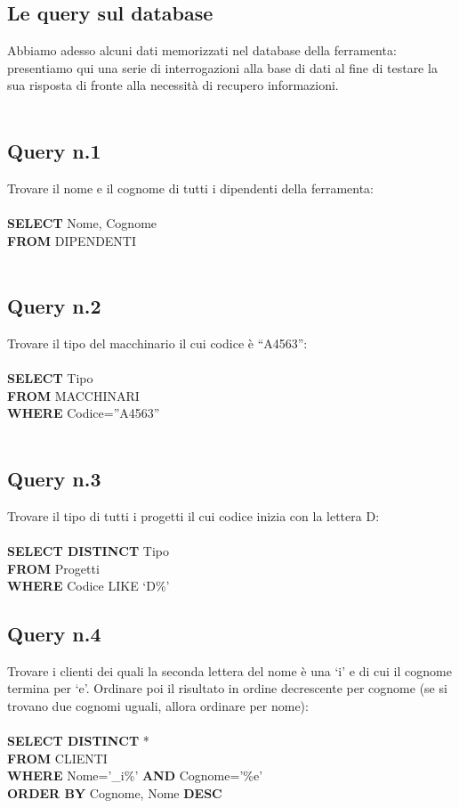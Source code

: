 \documentclass[a4paper,12pt,italian]{article}
\begin{document}
\subsection{Le query sul database}
Abbiamo adesso alcuni dati memorizzati nel database della ferramenta: presentiamo qui una serie di interrogazioni alla base di dati al fine di testare la sua risposta di fronte alla necessità di recupero informazioni. \\ \\

\subsection*{Query n.1} 
Trovare il nome e il cognome di tutti i dipendenti della ferramenta: \\ \\
\textbf{SELECT} Nome, Cognome \\
\textbf{FROM} DIPENDENTI \\ \\

\subsection*{Query n.2} 
Trovare il tipo del macchinario il cui codice è “A4563”: \\ \\
\textbf{SELECT} Tipo \\
\textbf{FROM} MACCHINARI \\
\textbf{WHERE} Codice=”A4563” \\ \\

\subsection*{Query n.3} 
Trovare il tipo di tutti i progetti il cui codice inizia con la lettera D: \\ \\
\textbf{SELECT DISTINCT} Tipo \\
\textbf{FROM} Progetti \\
\textbf{WHERE} Codice LIKE ‘D\%’ \\

\subsection*{Query n.4}
Trovare i clienti dei quali la seconda lettera del nome è una ‘i’ e di cui il cognome termina per ‘e’. Ordinare poi il risultato in ordine decrescente per cognome (se si trovano due cognomi uguali, allora ordinare per nome): \\ \\
\textbf{SELECT DISTINCT} * \\
\textbf{FROM} CLIENTI \\
\textbf{WHERE} Nome=’\_i\%’ \textbf{AND} Cognome=’\%e’ \\
\textbf{ORDER BY} Cognome, Nome \textbf{DESC} \\ \\ 
\end{document}
